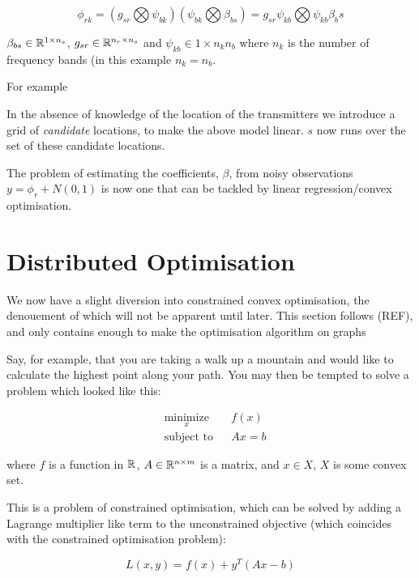 \documentclass[titlepage]{article}
\begin{document}
\begin{equation}
\phi_{rk} = \left( g_{sr} \bigotimes \psi_{bk} \right)\left(\psi_{bk} \bigotimes \beta_{bs}\right) = g_{sr}\psi_{kb} \bigotimes \psi_{kb}\beta_bs
\end{equation}

\(\beta_{bs} \in {\mathbb{R}}^{1 \times n_s}\), \(g_{sr} \in {\mathbb{R}}^{n_r \times n_s}\) and \(\psi_{kb} \in 1 \times n_kn_b\) where \(n_k\) is the number of frequency bands (in this example \(n_k = n_b\).

For example

In the absence of knowledge of the location of the transmitters we introduce a grid of \textit{candidate} locations, to make the above model linear. \(s\) now runs over the set of these candidate locations.

The problem of estimating the coefficients, \(\beta\), from noisy observations \(y = \phi_r + N\left(0,1\right)\) is now one that can be tackled by linear regression/convex optimisation.


\section{Distributed Optimisation}
We now have a slight diversion into constrained convex optimisation, the denouement of which will not be apparent until later. This section follows (REF), and only contains enough to make the optimisation algorithm on graphs

Say, for example, that you are taking a walk up a mountain and would like to calculate the highest point along your path. You may then be tempted to solve a problem which looked like this:

\begin{equation*}
\begin{aligned}
& \underset{x}{\text{minimize}}
& & f\left( x \right) \\
& \text{subject to}
& & Ax = b
\label{orig_problem}
\end{aligned}
\end{equation*}

where \(f\) is a function in \({\mathbb{R}}\), \(A \in {\mathbb{R}}^{n \times m}\) is a matrix, and \(x\in X\), \(X\) is some convex set.

This is a problem of constrained optimisation, which can be solved by adding a Lagrange multiplier like term to the unconstrained objective (which coincides with the constrained optimisation problem): 

\begin{equation}
L\left(x,y\right) = f\left( x \right) + y^T\left(Ax-b\right)
\end{equation}
\end{document}
